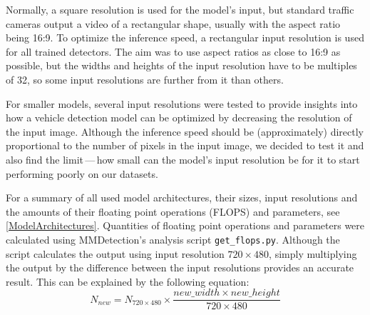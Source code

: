 Normally, a square resolution is used for the model's input, but standard traffic cameras
output a video of a rectangular shape, usually with the aspect ratio being 16:9.
To optimize the inference speed, a rectangular input resolution is used for all
trained detectors. The aim was to use aspect ratios as close to 16:9 as
possible, but the widths and heights of the input resolution have to be multiples of
32, so some input resolutions are further from it than others.

For smaller models, several input resolutions were tested to provide insights
into how a vehicle detection model can be optimized by decreasing the resolution
of the input image. Although the inference speed should be (approximately)
directly proportional to the number of pixels in the input image, we decided to
test it and also find the limit\,---\,how small can the model's input resolution
be for it to start performing poorly on our datasets.

For a summary of all used model architectures, their sizes, input resolutions and the
amounts of their floating point operations (FLOPS) and parameters, see
\autoref{ModelArchitectures}. Quantities of floating point operations and
parameters were calculated using MMDetection's analysis script
\verb|get_flops.py|. Although the script calculates the output using input
resolution $720 \times 480$, simply multiplying the output by the difference
between the input resolutions provides an accurate result. This can be explained
by the following equation:
\begin{equation}
    N_{new} = N_{720 \times 480} \times \frac{new\_width \times new\_height}{720 \times 480}
\end{equation}



